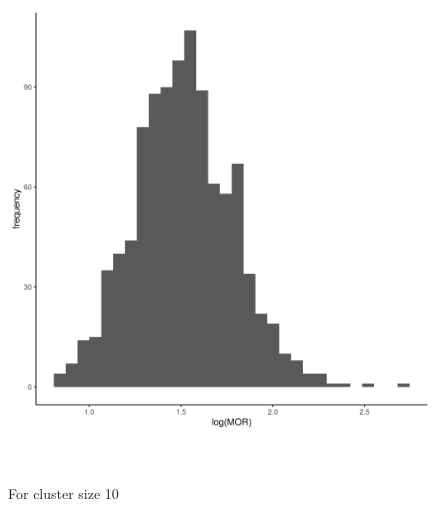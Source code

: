 \documentclass[
  letterpaper,
  DIV=11,
  numbers=noendperiod,
  titlepage]{scrartcl}
\begin{document}
\begin{figure}
\begin{minipage}[t]{0.50\linewidth}
{{\includegraphics{../../plots/two-lvl-ran-int/high-prev/hist_50_10_two_lvl_high_prev.png}

}

\caption{For cluster size 10}

}

\end{minipage}%
\newline
\begin{minipage}[t]{\linewidth}

{\centering 

~

}

\end{minipage}%
\newline
\begin{minipage}[t]{0.50\linewidth}

{\centering 

\raisebox{-\height}{

}}
\end{minipage}
\end{figure}
\end{document}
